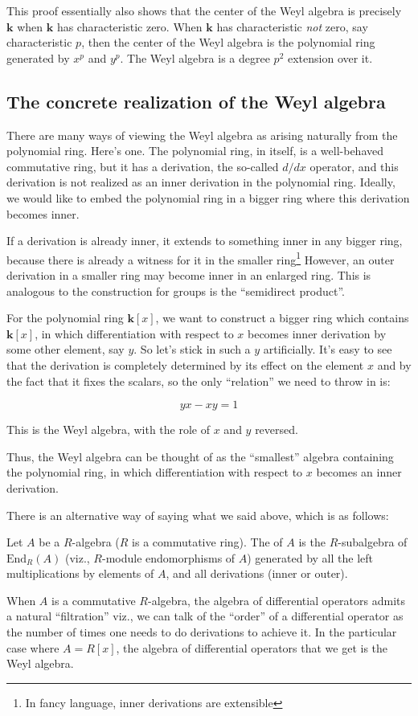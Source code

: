 \documentclass[a4paper]{amsart}
\newcommand{\Endo}[2]{\text{End}_{#1}\left(#2\right)}
\newcommand{\field}{\mathbf{k}}
\begin{document}
This proof essentially also shows that the center of the Weyl algebra
is precisely $\field$ when $\field$ has characteristic zero. When
$\field$ has characteristic {\em not} zero, say characteristic $p$,
then the center of the Weyl algebra is the polynomial ring generated
by $x^p$ and $y^p$. The Weyl algebra is a degree $p^2$ extension over
it.

\subsection{The concrete realization of the Weyl algebra}

There are many ways of viewing the Weyl algebra as arising naturally
from the polynomial ring. Here's one. The polynomial ring, in itself,
is a well-behaved commutative ring, but it has a derivation, the
so-called $d/dx$ operator, and this derivation is not realized as an
inner derivation in the polynomial ring. Ideally, we would like to
embed the polynomial ring in a bigger ring where this derivation
becomes inner.

If a derivation is already inner, it extends to something inner in any
bigger ring, because there is already a witness for it in the smaller
ring\footnote{In fancy language, inner derivations are extensible}
However, an outer derivation in a smaller ring may become inner in an
enlarged ring. This is analogous to the construction for groups is the
``semidirect product''. 

For the polynomial ring $\field[x]$, we want to construct a bigger
ring which contains $\field[x]$, in which differentiation with respect
to $x$ becomes inner derivation by some other element, say $y$. So
let's stick in such a $y$ artificially. It's easy to see that the
derivation is completely determined by its effect on the element $x$
and by the fact that it fixes the scalars, so the only ``relation'' we
need to throw in is:

$$yx - xy = 1$$

This is the Weyl algebra, with the role of $x$ and $y$ reversed.

Thus, the Weyl algebra can be thought of as the ``smallest'' algebra
containing the polynomial ring, in which differentiation with respect
to $x$ becomes an inner derivation.

There is an alternative way of saying what we said above, which is as follows:

\begin{definer}
  Let $A$ be a $R$-algebra ($R$ is a commutative ring). The
   of $A$ is the
  $R$-subalgebra of $\Endo{R}{A}$ (viz., $R$-module endomorphisms of
  $A$) generated by all the left multiplications by elements of $A$,
  and all derivations (inner or outer).

  When $A$ is a commutative $R$-algebra, the algebra of differential
  operators admits a natural ``filtration'' viz., we can talk of the
  ``order'' of a differential operator as the number of times one
  needs to do derivations to achieve it. In the particular case where
  $A = R[x]$, the algebra of differential operators that we get is the
  Weyl algebra.
\end{definer}
\end{document}
